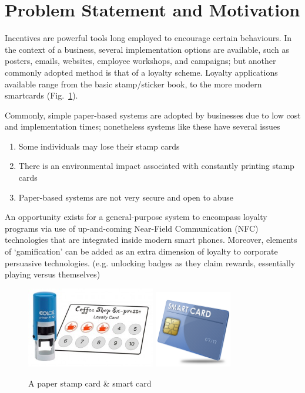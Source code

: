 \section{Problem Statement and Motivation}
Incentives are powerful tools long employed to encourage certain behaviours. In the context of a business, several implementation options are available, such as posters, emails, websites, employee workshops, and campaigns; but another commonly adopted method is that of a loyalty scheme. Loyalty applications available range from the basic stamp/sticker book, to the more modern smartcards (Fig.~\ref{fig:smartcard}).

Commonly, simple paper-based systems are adopted by businesses due to low cost and implementation times; nonetheless systems like these have several issues
\begin{enumerate}
\item Some individuals may lose their stamp cards
\item There is an environmental impact associated with constantly printing stamp cards
\item Paper-based systems are not very secure and open to abuse
\end{enumerate}

An opportunity exists for a general-purpose system to encompass loyalty programs via use of up-and-coming Near-Field Communication (NFC) technologies that are integrated inside modern smart phones. Moreover, elements of `gamification' can be added as an extra dimension of loyalty to corporate persuasive technologies. (e.g. unlocking badges as they claim rewards, essentially playing versus themselves)

\begin{figure}[h!]
    \centering
    \includegraphics[width=0.5\textwidth]{img/Loyalty-card.jpg}
    \qquad
    \includegraphics[width=0.3\textwidth]{img/smartcard.png}
    \caption{A paper stamp card \& smart card}%
    \label{fig:smartcard}
\end{figure}
\clearpage{}

